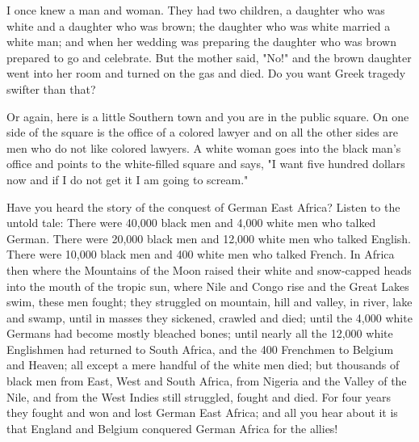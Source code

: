 \documentclass[12pt]{article}
\begin{document}

{\duboispara}%
I once knew a man and woman. They had two children, a daughter who was white and a daughter who was brown; the daughter who was white married a white man; and when her wedding was preparing the daughter who was brown prepared to go and celebrate. But the mother said, "No!" and the brown daughter went into her room and turned on the gas and died. Do you want Greek tragedy swifter than that?

{\duboispara}%
Or again, here is a little Southern town and you are in the public square. On one side of the square is the office of a colored lawyer and on all the other sides are men who do not like colored lawyers. A white woman goes into the black man's office and points to the white-filled square and says, "I want five hundred dollars now and if I do not get it I am going to scream." 

{\duboispara}%
Have you heard the story of the conquest of German East Africa? Listen to the untold tale: There were 40,000 black men and 4,000 white men who talked German. There were 20,000 black men and 12,000 white men who talked English. There were 10,000 black men and 400 white men who talked French. In Africa then where the Mountains of the Moon raised their white and snow-capped heads into the mouth of the tropic sun, where Nile and Congo rise and the Great Lakes swim, these men fought; they struggled on mountain, hill and valley, in river, lake and swamp, until in masses they sickened, crawled and died; until the 4,000 white Germans had become mostly bleached bones; until nearly all the 12,000 white Englishmen had returned to South Africa, and the 400 Frenchmen to Belgium and Heaven; all except a mere handful of the white men died; but thousands of black men from East, West and South Africa, from Nigeria and the Valley of the Nile, and from the West Indies still struggled, fought and died. For four years they fought and won and lost German East Africa; and all you hear about it is that England and Belgium conquered German Africa for the allies! 
\end{document}
